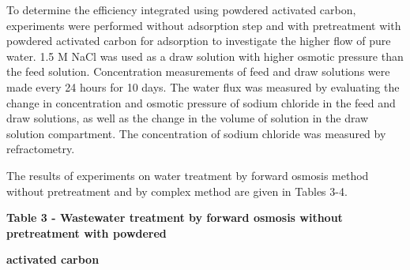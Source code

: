 To determine the efficiency integrated using powdered activated carbon,
experiments were performed without adsorption step and with pretreatment
with powdered activated carbon for adsorption to investigate the higher
flow of pure water. 1.5 M NaCl was used as a draw solution with higher
osmotic pressure than the feed solution. Concentration measurements of
feed and draw solutions were made every 24 hours for 10 days. The water
flux was measured by evaluating the change in concentration and osmotic
pressure of sodium chloride in the feed and draw solutions, as well as
the change in the volume of solution in the draw solution compartment.
The concentration of sodium chloride was measured by refractometry.

The results of experiments on water treatment by forward osmosis method
without pretreatment and by complex method are given in Tables 3-4.

{\bfseries Table 3 - Wastewater treatment by forward osmosis without
pretreatment with powdered}

{\bfseries activated carbon}

